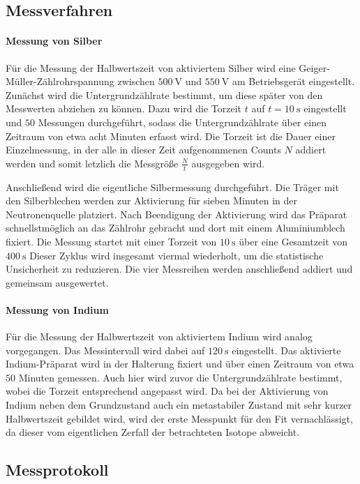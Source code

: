 \subsection{Messverfahren}
\paragraph{Messung von Silber}
Für die Messung der Halbwertszeit von aktiviertem Silber wird eine Geiger-Müller-Zählrohrspannung zwischen \(\qty{500}{\volt}\) und \(\qty{550}{\volt}\) am Betriebsgerät eingestellt. Zunächst wird die Untergrundzählrate bestimmt, um diese später von den Messwerten abziehen zu können. Dazu wird die Torzeit \(t\) auf \(t=\qty{10}{\s}\) eingestellt und \(50\) Messungen durchgeführt, sodass die Untergrundzählrate über einen Zeitraum von etwa acht Minuten erfasst wird. Die Torzeit ist die Dauer einer Einzelmessung, in der alle in dieser Zeit aufgenommenen Counts \(N\) addiert werden und somit letzlich die Messgröße \(\frac{N}{t}\) ausgegeben wird. 

Anschließend wird die eigentliche Silbermessung durchgeführt. Die Träger mit den Silberblechen werden zur Aktivierung für sieben Minuten in der Neutronenquelle platziert. Nach Beendigung der Aktivierung wird das Präparat schnellstmöglich an das Zählrohr gebracht und dort mit einem Aluminiumblech fixiert. Die Messung startet mit einer Torzeit von \(\qty{10}{\s}\) über eine Gesamtzeit von \(\qty{400}{\s}\) Dieser Zyklus wird insgesamt viermal wiederholt, um die statistische Unsicherheit zu reduzieren. Die vier Messreihen werden anschließend addiert und gemeinsam ausgewertet.

\paragraph{Messung von Indium}
Für die Messung der Halbwertszeit von aktiviertem Indium wird analog vorgegangen. Das Messintervall wird dabei auf \(\qty{120}{\s}\) eingestellt. Das aktivierte Indium-Präparat wird in der Halterung fixiert und über einen Zeitraum von etwa \(50\) Minuten gemessen. Auch hier wird zuvor die Untergrundzählrate bestimmt, wobei die Torzeit entsprechend angepasst wird. Da bei der Aktivierung von Indium neben dem Grundzustand auch ein metastabiler Zustand mit sehr kurzer Halbwertszeit gebildet wird, wird der erste Messpunkt für den Fit vernachlässigt, da dieser vom eigentlichen Zerfall der betrachteten Isotope abweicht.
\vfill
\subsection{Messprotokoll}


